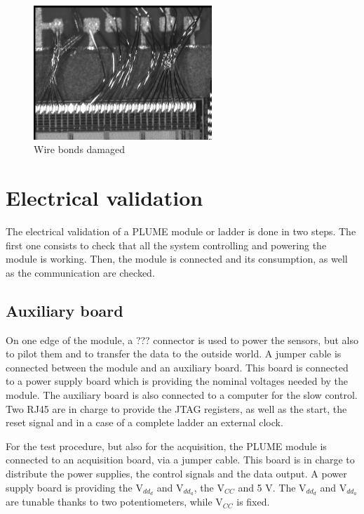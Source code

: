   \begin{figure}
    \centering
    \includegraphics[width=0.6\textwidth]{Pictures/labTests/crash_bonds.jpg}
    \caption{Wire bonds damaged }
  \end{figure}

\section{Electrical validation}

  The electrical validation of a \gls{PLUME} module or ladder is done in two steps.
  The first one consists to check that all the system controlling and powering the module is working. 
  Then, the module is connected and its consumption, as well as the communication are checked.

  \subsection{Auxiliary board}

  On one edge of the module, a ??? connector is used to power the sensors, but also to pilot them and to transfer the data to the outside world.
  A jumper cable is connected between the module and an auxiliary board.
  This board is connected to a power supply board which is providing the nominal voltages needed by the module.
  The auxiliary board is also connected to a computer for the slow control.
  Two RJ45 are in charge to provide the JTAG registers, as well as the start, the reset signal and in a case of a complete ladder an external clock.

  For the test procedure, but also for the acquisition, the PLUME module is connected to an acquisition board, via a jumper cable.
  This board is in charge to distribute the power supplies, the control signals and the data output.
  A power supply board is providing the $\text{V}_{dd_d}$ and $\text{V}_{dd_a}$, the $\text{V}_{CC}$ and 5 V.
  The $\text{V}_{dd_d}$ and $\text{V}_{dd_a}$ are tunable thanks to two potentiometers, while $\text{V}_{CC}$ is fixed.

